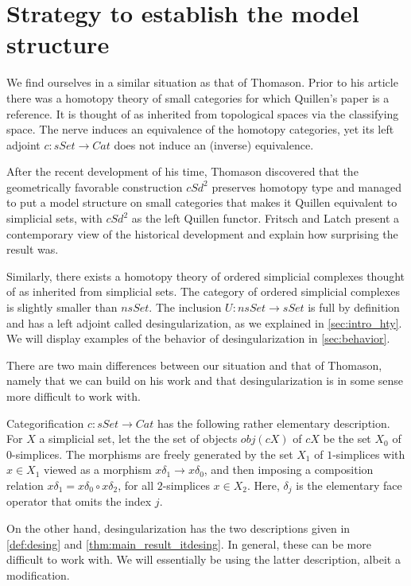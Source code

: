 
\section{Strategy to establish the model structure}
\label{sec:structure}

\noindent We find ourselves in a similar situation as that of Thomason. Prior to his article \cite{Th80} there was a homotopy theory of small categories for which Quillen's paper \cite{Qu67} is a reference. It is thought of as inherited from topological spaces via the classifying space. The nerve induces an equivalence of the homotopy categories, yet its left adjoint $c:sSet\to Cat$ does not induce an (inverse) equivalence.

After the recent development of his time, Thomason discovered that the geometrically favorable construction $cSd^2$ preserves homotopy type \cite{Th80} and managed to put a model structure on small categories that makes it Quillen equivalent to simplicial sets, with $cSd^2$ as the left Quillen functor. Fritsch and Latch \cite{FL81} present a contemporary view of the historical development and explain how surprising the result was.

Similarly, there exists a homotopy theory of ordered simplicial complexes thought of as inherited from simplicial sets. The category of ordered simplicial complexes is slightly smaller than $nsSet$. The inclusion $U:nsSet\to sSet$ is full by definition and has a left adjoint called desingularization, as we explained in \cref{sec:intro_hty}. We will display examples of the behavior of desingularization in \cref{sec:behavior}.

There are two main differences between our situation and that of Thomason, namely that we can build on his work and that desingularization is in some sense more difficult to work with.

Categorification $c:sSet\to Cat$ has the following rather elementary description. For $X$ a simplicial set, let the the set of objects $obj(cX)$ of $cX$ be the set $X_0$ of $0$-simplices. The morphisms are freely generated by the set $X_1$ of $1$-simplices with $x\in X_1$ viewed as a morphism $x\delta _1\to x\delta _0$, and then imposing a composition relation $x\delta _1=x\delta _0\circ x\delta _2$, for all $2$-simplices $x\in X_2$. Here, $\delta _j$ is the elementary face operator that omits the index $j$.

On the other hand, desingularization has the two descriptions given in \cref{def:desing} and \cref{thm:main_result_itdesing}. In general, these can be more difficult to work with. We will essentially be using the latter description, albeit a modification.

